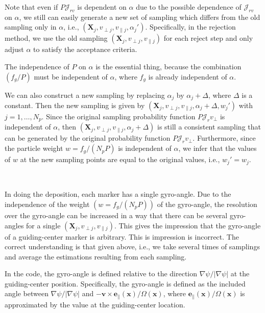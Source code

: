 \documentclass{llncs}
\begin{document}
Note that even if $P \mathcal{J}_{r v}$ is dependent on $\alpha$ due to the
possible dependence of $\mathcal{J}_{r v}$ on $\alpha$, we still can easily
generate a new set of sampling which differs from the old sampling only in
$\alpha$, i.e., $(\mathbf{X}_j, v_{\perp j}, v_{\parallel j}, \alpha_j')$.
Specifically, in the rejection method, we use the old sampling $(\mathbf{X}_j,
v_{\perp j}, v_{\parallel j})$ for each reject step and only adjust $\alpha$
to satisfy the acceptance criteria.

The independence of $P$ on $\alpha$ is the essential thing, because the
combination $(f_g / P)$ must be independent of $\alpha$, where $f_g$ is
already independent of $\alpha$.

We can also construct a new sampling by replacing $\alpha_j$ by $\alpha_j +
\Delta$, where $\Delta$ is a constant. Then the new sampling is given by
$(\mathbf{X}_j, v_{\perp j}, v_{\parallel j}, \alpha_j + \Delta, w_j')$ with
$j = 1, \ldots, N_p$. Since the original sampling probability function $P
\mathcal{J}_r v_{\perp}$ is independent of $\alpha$, then $(\mathbf{X}_j,
v_{\perp j}, v_{\parallel j}, \alpha_j + \Delta)$ is still a consistent
sampling that can be generated by the original probability function $P
\mathcal{J}_r v_{\perp}$. Furthermore, since the particle weight $w = f_g /
(N_p P)$ is independent of $\alpha$, we infer that the values of $w$ at the
new sampling points are equal to the original values, i.e., $w_j' = w_j$.

\

In doing the deposition, each marker has a single gyro-angle. Due to the
independence of the weight $(w = f_g / (N_p P))$ of the gyro-angle, the
resolution over the gyro-angle can be increased in a way that there can be
several gyro-angles for a single $(\mathbf{X}_j, v_{\perp j}, v_{\parallel
j})$. This gives the impression that the gyro-angle of a guiding-center marker
is arbitrary. This is impression is incorrect. The correct understanding is
that given above, i.e., we take several times of samplings and average the
estimations resulting from each sampling.

In the code, the gyro-angle is defined relative to the direction $\nabla \psi
/ | \nabla \psi |$ at the guiding-center position. Specifically, the
gyro-angle is defined as the included angle between $\nabla \psi / | \nabla
\psi |$ and $-\mathbf{v} \times \mathbf{e}_{\parallel} (\mathbf{x}) / \Omega
(\mathbf{x})$, where $\mathbf{e}_{\parallel} (\mathbf{x}) / \Omega
(\mathbf{x})$ is approximated by the value at the guiding-center location.
\end{document}
